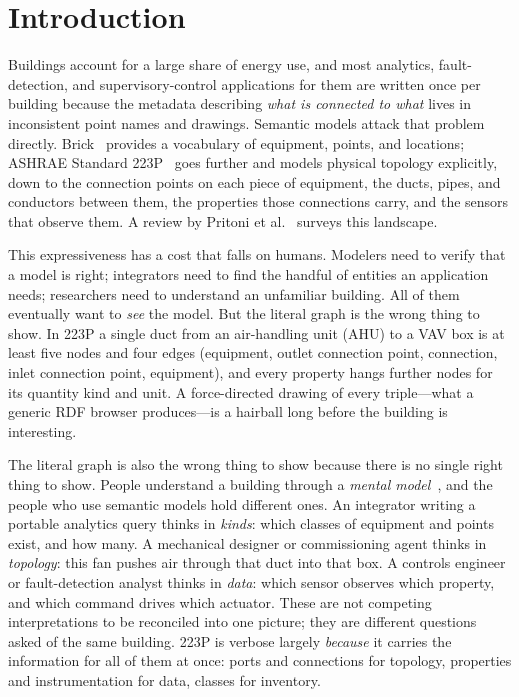 \documentclass[10pt,twocolumn]{article}
\begin{document}
\section{Introduction}

Buildings account for a large share of energy use, and most analytics,
fault-detection, and supervisory-control applications for them are written once
per building because the metadata describing \emph{what is connected to what}
lives in inconsistent point names and drawings. Semantic models attack that
problem directly. Brick~\cite{balaji2016brick} provides a vocabulary of
equipment, points, and locations; ASHRAE Standard 223P~\cite{ashrae223p} goes
further and models physical topology explicitly, down to the connection points on
each piece of equipment, the ducts, pipes, and conductors between them, the
properties those connections carry, and the sensors that observe them. A
review by Pritoni et al.~\cite{pritoni2021metadata} surveys this landscape.

This expressiveness has a cost that falls on humans. Modelers need to verify that
a model is right; integrators need to find the handful of entities an application
needs; researchers need to understand an unfamiliar building. All of them
eventually want to \emph{see} the model. But the literal graph is the wrong thing
to show. In 223P a single duct from an air-handling unit (AHU) to a VAV box is at
least five nodes and four edges (equipment, outlet connection point, connection,
inlet connection point, equipment), and every property hangs further nodes for its
quantity kind and unit. A force-directed drawing of every triple---what a generic
RDF browser produces---is a hairball long before the building is interesting.

The literal graph is also the wrong thing to show because there is no single
right thing to show. People understand a building through a \emph{mental
model}~\cite{johnsonlaird1983mental,norman2013design}, and the people who use
semantic models hold different ones. An integrator writing a portable analytics
query thinks in \emph{kinds}: which classes of equipment and points exist, and how
many. A mechanical designer or commissioning agent thinks in \emph{topology}: this
fan pushes air through that duct into that box. A controls engineer or
fault-detection analyst thinks in \emph{data}: which sensor observes which
property, and which command drives which actuator. These are not competing
interpretations to be reconciled into one picture; they are different questions
asked of the same building. 223P is verbose largely \emph{because} it carries the
information for all of them at once: ports and connections for topology,
properties and instrumentation for data, classes for inventory.
\end{document}
